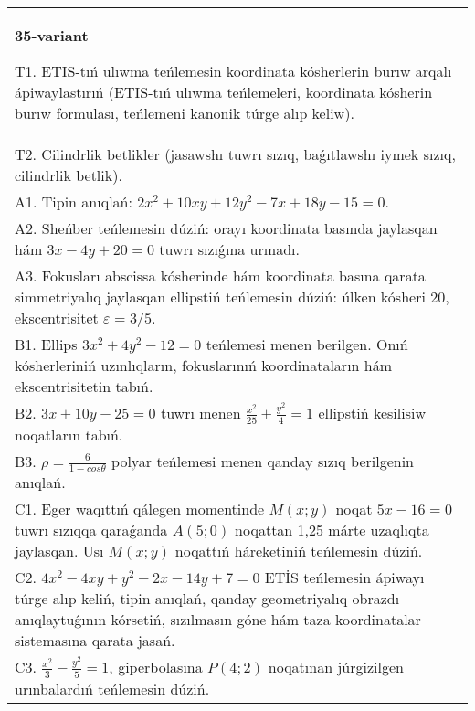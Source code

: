 \documentclass{article}
\begin{document}
\begin{tabular}{m{17cm}}
\textbf{35-variant}
\newline

T1. ETIS-tıń ulıwma teńlemesin koordinata kósherlerin burıw arqalı ápiwaylastırıń (ETIS-tıń ulıwma teńlemeleri, koordinata kósherin burıw formulası, teńlemeni kanonik túrge alıp keliw).\\

T2. Cilindrlik betlikler (jasawshı tuwrı sızıq, baǵıtlawshı iymek sızıq, cilindrlik betlik).\\

A1. Tipin anıqlań: $2 x^{2}+10 xy+12 y^{2}-7 x+18 y-15=0$.\\

A2. Sheńber teńlemesin dúziń: orayı koordinata basında jaylasqan hám $3 x-4 y+20=0$ tuwrı sızıǵına urınadı.\\

A3. Fokusları abscissa kósherinde hám koordinata basına qarata simmetriyalıq jaylasqan ellipstiń teńlemesin dúziń: úlken kósheri $20$, ekscentrisitet $\varepsilon=3/5$.\\

B1. Ellips $3x^{2} + 4y^{2} - 12 = 0$ teńlemesi menen berilgen. Onıń kósherleriniń uzınlıqların, fokuslarınıń koordinataların hám ekscentrisitetin tabıń.  \\

B2. $3x + 10y - 25 = 0$ tuwrı menen $\frac{x^{2}}{25} + \frac{y^{2}}{4} = 1$ ellipstiń kesilisiw noqatların tabıń.\\

B3. $\rho = \frac{6}{1 - cos\theta}$ polyar teńlemesi menen qanday sızıq berilgenin anıqlań.  \\

C1. Eger waqıttıń qálegen momentinde $M(x;y)$ noqat $5x - 16 = 0$ tuwrı sızıqqa qaraǵanda $A(5;0)$ noqattan 1,25 márte uzaqlıqta jaylasqan. Usı $M(x;y)$ noqattıń háreketiniń teńlemesin dúziń.  \\

C2. $4x^{2} - 4xy + y^{2} - 2x - 14y + 7 = 0$ ETİS teńlemesin ápiwayı túrge alıp keliń, tipin anıqlań, qanday geometriyalıq obrazdı anıqlaytuǵının kórsetiń, sızılmasın góne hám taza koordinatalar sistemasına qarata jasań.  \\

C3. $\frac{x^{2}}{3} - \frac{y^{2}}{5} = 1$, giperbolasına $P(4;2)$ noqatınan júrgizilgen urınbalardıń teńlemesin dúziń.  \\

\end{tabular}
\vspace{1cm}
\end{document}
